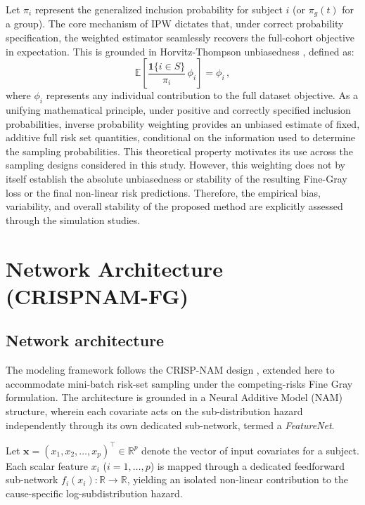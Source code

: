 \documentclass[a4paper,twoside,12pt]{report}
\begin{document}
Let $\pi_i$ represent the generalized inclusion probability for subject $i$ (or $\pi_g(t)$ for a group). The core mechanism of IPW dictates that, under correct probability specification, the weighted estimator seamlessly recovers the full-cohort objective in expectation. This is grounded in Horvitz-Thompson unbiasedness \citep{HorvitzThompson1952}, defined as:
$$\mathbb{E}\!\left[\frac{\mathbf{1}\{i \in S\}}{\pi_i} \, \phi_i \right] = \phi_i \,,$$
where $\phi_i$ represents any individual contribution to the full dataset objective. As a unifying mathematical principle, under positive and correctly specified inclusion probabilities, inverse probability weighting provides an unbiased estimate of fixed, additive full risk set quantities, conditional on the information used to determine the sampling probabilities. This theoretical property motivates its use across the sampling designs considered in this study. However, this weighting does not by itself establish the absolute unbiasedness or stability of the resulting Fine-Gray loss or the final non-linear risk predictions. Therefore, the empirical bias, variability, and overall stability of the proposed method are explicitly assessed through the simulation studies.

\section{Network Architecture (CRISPNAM-FG)}
\subsection{Network architecture}

The modeling framework follows the CRISP-NAM design \citep{InterpretableFineGray2025}, extended here to accommodate mini-batch risk-set sampling under the competing-risks Fine Gray formulation. The architecture is grounded in a Neural Additive Model (NAM) structure, wherein each covariate acts on the sub-distribution hazard independently through its own dedicated sub-network, termed a \textit{FeatureNet}.

Let $\mathbf{x} = (x_1, x_2, \dots, x_p)^\top \in \mathbb{R}^p$ denote the vector of input covariates for a subject. Each scalar feature $x_i$ ($i = 1, \dots, p$) is mapped through a dedicated feedforward sub-network $f_i(x_i): \mathbb{R} \to \mathbb{R}$, yielding an isolated non-linear contribution to the cause-specific log-subdistribution hazard.
\end{document}
